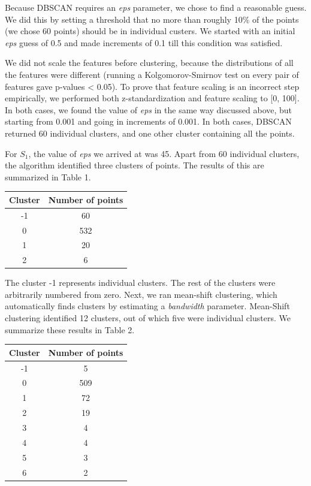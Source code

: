 \documentclass[12pt,a4paper,twocolumn]{article}
\begin{document}
	Because DBSCAN requires an \textit{eps} parameter, we chose to find a reasonable guess. We did this by setting a threshold that no more than roughly 10\% of the points (we chose 60 points) should be in individual custers. We started with an initial \textit{eps} guess of 0.5 and made increments of 0.1 till this condition was satisfied.
	
	We did not scale the features before clustering, because the distributions of all the features were different (running a Kolgomorov-Smirnov test on every pair of features gave p-values < 0.05). To prove that feature scaling is an incorrect step empirically, we performed both z-standardization and feature scaling to [0, 100]. In both cases, we found the value of \textit{eps} in the same way discussed above, but starting from 0.001 and going in increments of 0.001. In both cases, DBSCAN returned 60 individual clusters, and one other cluster containing all the points.
	
	For $S_1$, the value of \textit{eps} we arrived at was 45. Apart from 60 individual clusters, the algorithm identified three clusters of points. The results of this are summarized in Table 1. \\
	
	\begin{tabular}{|c|c|}
		\hline 
		\textbf{Cluster} & \textbf{Number of points} \\ 
		\hline 
		-1 & 60 \\ 
		\hline 
		0 & 532 \\ 
		\hline 
		1 & 20 \\ 
		\hline 
		2 & 6 \\ 
		\hline 
	\end{tabular}
	\begingroup
	\endgroup
	\hfill\break
	
	The cluster -1 represents individual clusters. The rest of the clusters were arbitrarily numbered from zero. Next, we ran mean-shift clustering, which automatically finds clusters by estimating a \textit{bandwidth} parameter. Mean-Shift clustering identified 12 clusters, out of which five were individual clusters. We summarize these results in Table 2.\\
	
	\begin{tabular}{|c|c|}
		\hline 
		\textbf{Cluster} & \textbf{Number of points} \\ 
		\hline 
		-1 & 5 \\ 
		\hline 
		0 & 509 \\ 
		\hline 
		1 & 72 \\ 
		\hline 
		2 & 19 \\ 
		\hline 
		3 & 4 \\ 
		\hline 
		4 & 4 \\ 
		\hline 
		5 & 3 \\ 
		\hline 
		6 & 2 \\ 
		\hline 
	\end{tabular}
	\begingroup
	\endgroup
	\hfill\break
	
\end{document}
